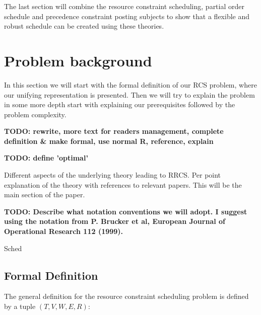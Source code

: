 \documentclass{article}
\newcommand{\TODO}[1]{{\color{red}\textbf{TODO: #1}}}
\begin{document}
The last section will combine the resource constraint scheduling, partial order schedule and precedence constraint posting subjects to show that a flexible and robust schedule can be created using these theories. 

\newpage

\section{Problem background}
In this section we will start with the formal definition of our RCS problem, where our unifying representation is presented.
Then we will try to explain the problem in some more depth start with explaining our prerequisites followed by the problem complexity.

\TODO{rewrite, more text for readers management, complete definition \& make formal, use normal R, reference, explain}

\TODO{define 'optimal'}

Different aspects of the underlying theory leading to RRCS.
 Per point explanation of the theory with references to relevant papers.
This will be the main section of the paper.

\TODO{Describe what notation conventions we will adopt.
I suggest using the notation from P. Brucker et al, European Journal of Operational Research 112 (1999). }

Sched
\subsection{Formal Definition}
The general definition for the resource constraint scheduling problem is defined by a tuple $(T, V, W, E, R)$: \cite{brucker99}
\end{document}
